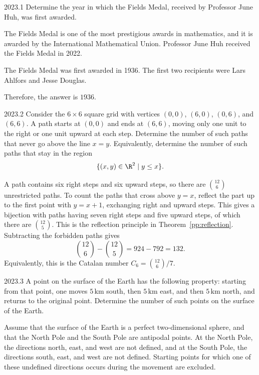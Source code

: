     \begin{pastproblem}{2023.1}
        Determine the year in which the Fields Medal, received by Professor June Huh, was first
        awarded.
    \end{pastproblem}

    \begin{solution}
        The Fields Medal is one of the most prestigious awards in mathematics, and it is awarded by
        the International Mathematical Union. Professor June Huh received the Fields Medal in 2022.

        The Fields Medal was first awarded in 1936. The first two recipients were Lars Ahlfors and
        Jesse Douglas.

        Therefore, the answer is $\boxed{1936}$.
    \end{solution}

    \begin{pastproblem}{2023.2}
        Consider the $6\times 6$ square grid with vertices $(0,0)$, $(6,0)$, $(0,6)$, and $(6,6)$. A
        path starts at $(0,0)$ and ends at $(6,6)$, moving only one unit to the right or one unit
        upward at each step. Determine the number of such paths that never go above the line $x=y$.
        Equivalently, determine the number of such paths that stay in the region
        \[
            \{(x,y)\in\R^2\mid y\leq x\}.
        \]
    \end{pastproblem}

    \begin{solution}
A path contains six right steps and six upward steps, so there are
        $\binom{12}{6}$ unrestricted paths. To count the paths that cross above
        $y=x$, reflect the part up to the first point with $y=x+1$, exchanging
        right and upward steps. This gives a bijection with paths having seven
        right steps and five upward steps, of which there are $\binom{12}{5}$.
        This is the reflection principle in Theorem~\ref{pp:reflection}.
        Subtracting the forbidden paths gives
        \[
            \binom{12}{6}-\binom{12}{5}
            =924-792
            =\boxed{132}.
        \]
        Equivalently, this is the Catalan number $C_6=\binom{12}{6}/7$.
    \end{solution}

    \begin{pastproblem}{2023.3}
        A point on the surface of the Earth has the following property: starting from that point,
        one moves $5\,\mathrm{km}$ south, then $5\,\mathrm{km}$ east, and then $5\,\mathrm{km}$ north, and
        returns to the original point. Determine the number of such points on the surface of the
        Earth.

        Assume that the surface of the Earth is a perfect two-dimensional sphere, and that the North
        Pole and the South Pole are antipodal points. At the North Pole, the directions north, east,
        and west are not defined, and at the South Pole, the directions south, east, and west are
        not defined. Starting points for which one of these undefined directions occurs during the
        movement are excluded.
    \end{pastproblem}

